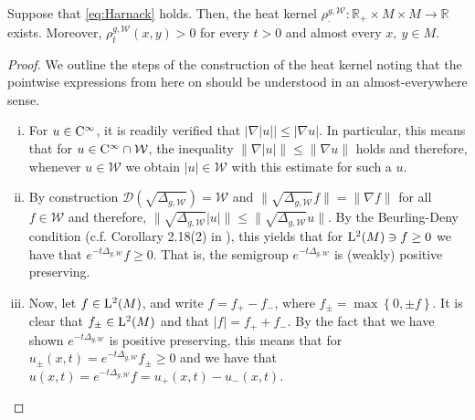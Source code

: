 \documentclass[a4paper, 12pt]{amsart}
\numberwithin{equation}{section}
\renewcommand{\~}{\tilde}
\renewcommand{\-}{\bar}
\newcommand{\R}{\mathbb{R}}
\newcommand{\8}{\infty}
\newcommand{\cW}{\mathcal{W}}
\newcommand{\mdot}{\cdotp}
\newcommand{\dbrac}[1]{\left\{#1\right\}}
\newcommand{\modulus}[1]{|#1|}
\newcommand{\set}[1]{\dbrac{#1}}
\newcommand{\dom}{ {\mathcal{D}}}
\newcommand{\intersect}{\cap}
\newcommand{\norm}[1]{\| #1 \|}			%
\newcommand{\Lp}[2][{}]{{\rm L}^{#2}_{\rm #1}}		%
\newcommand{\Ck}[2][{}]{{\rm C}^{#2}_{\rm #1}}		%
\newcommand{\hk}{\rho}
\begin{document}
\begin{prop}
\label{prop:MainRed}
Suppose that \eqref{eq:Harnack} holds. Then, the heat
kernel $\hk^{g,\cW}_{\mdot}: \R_{+} \times M \times M \to \R$
exists. Moreover, $\hk^{g,\cW}_t(x,y) > 0$ for
every $t > 0$ and almost every $x,\ y \in M$. 
\end{prop} 
\begin{proof}
We outline the steps of the construction of the heat kernel
noting that the pointwise expressions from here on should be
understood in an almost-everywhere sense.
\begin{enumerate}[(i)]
\item For $u \in \Ck{\infty}$, it is readily verified that 
	$\modulus{ \nabla \modulus{u}} \leq \modulus{ \nabla u}.$
	In particular, this means that 
	for $u \in \Ck{\infty} \intersect \cW$,
	the inequality
	$\norm{\nabla \modulus{u}} \leq \norm{\nabla u}$ holds
	and therefore, whenever $u \in \cW$
	we obtain $\modulus{u} \in \cW$ 
	with this estimate for such a $u$.

\item 	By construction $\dom(\sqrt{\Delta_{g, \cW}}) = \cW$
	and $\norm{\sqrt{\Delta_{g,\cW}} f} = \norm{\nabla f}$
	for all $f \in \cW$ and therefore, 
	$\norm{\sqrt{\Delta_{g, \cW}} \modulus{u}} 
		\leq \norm{\sqrt{\Delta_{g, \cW}} u}$. 
	By the Beurling-Deny condition (c.f.  Corollary 2.18(2) in  \cite{El-Maati}), 
	this yields that for $\Lp{2}(M) \ni f \geq 0$
	we have that  $e^{-t \Delta_{g,\cW}} f \geq 0$. That is, the semigroup 
	$e^{-t \Delta_{g,\cW}}$ is (weakly) positive preserving.

\item Now, let $f \in \Lp{2}(M)$, and write
	$f = f_+ - f_-$, where $f_{\pm} = \max\set{0,\pm f}$.
	It is clear that $f_{\pm} \in \Lp{2}(M)$
	and that $\modulus{f} = f_+ + f_-$.
	By the fact that we have shown $e^{-t\Delta_{g,\cW}}$ 
	is positive preserving, this means that
	for $u_{\pm} (x,t) = e^{-t\Delta_{g,\cW}} f_{\pm} \geq 0$	
	and we have that $u(x,t) = e^{-t \Delta_{g,\cW}} f = u_+(x,t) - u_-(x,t)$.


\end{enumerate}
\end{proof}
\end{document}
